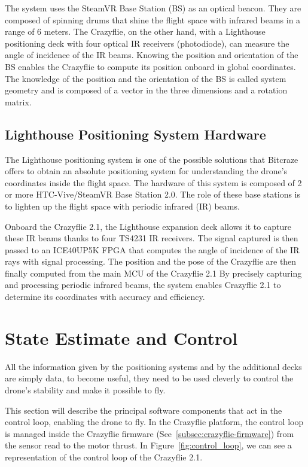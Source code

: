 The system uses the SteamVR Base Station (BS) as an optical beacon. 
They are composed of spinning drums that shine the flight space with infrared beams in a range of 6 meters. 
The Crazyflie, on the other hand, with a Lighthouse positioning deck with four optical IR receivers (photodiode), can measure the angle of incidence of the IR beams. 
Knowing the position and orientation of the BS enables the Crazyflie to compute its position onboard in global coordinates. 
The knowledge of the position and the orientation of the BS is called system geometry and is composed of a vector in the three dimensions and a rotation matrix. 


\subsection{Lighthouse Positioning System Hardware}\label{subsec:lighthouse_hardware}
The Lighthouse positioning system is one of the possible solutions that Bitcraze offers to obtain an absolute positioning system for understanding the drone's coordinates inside the flight space. 
The hardware of this system is composed of 2 or more HTC-Vive/SteamVR Base Station 2.0. 
The role of these base stations is to lighten up the flight space with periodic infrared (IR) beams.

Onboard the Crazyflie 2.1, the Lighthouse expansion deck allows it to capture these IR beams thanks to four TS4231 IR receivers. 
The signal captured is then passed to an ICE40UP5K FPGA that computes the angle of incidence of the IR rays with signal processing. 
The position and the pose of the Crazyflie are then finally computed from the main MCU of the Crazyflie 2.1
By precisely capturing and processing periodic infrared beams, the system enables Crazyflie 2.1 to determine its coordinates with accuracy and efficiency.

\section{State Estimate and Control}\label{sec:state_estimate_and_control}
All the information given by the positioning systems and by the additional decks are simply data,
to become useful, they need to be used cleverly to control the drone's stability and make it possible to fly. 

This section will describe the principal software components that act in the control loop, enabling the drone to fly.
In the Crazyflie platform, the control loop is managed inside the Crazyflie firmware (See~\ref{subsec:crazyflie-firmware}) from the sensor read to the motor thrust.
In Figure~\ref{fig:control_loop}, we can see a representation of the control loop of the Crazyflie 2.1. 

